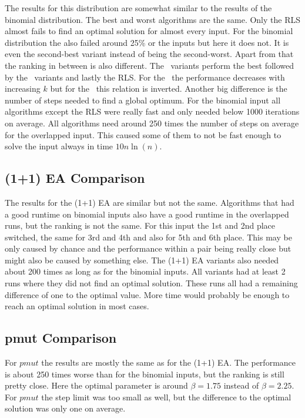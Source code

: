 The results for this distribution are somewhat similar to the results of the binomial distribution.
The best and worst algorithms are the same.
Only the RLS almost fails to find an optimal solution for almost every input.
For the binomial distribution the \RLSN[3] also failed around 25\% or the inputs but here it does not.
It is even the second-best variant instead of being the second-worst.
Apart from that the ranking in between is also different.
The \RLSN~variants perform the best followed by the \RLSR~variants and lastly the RLS.
For the \RLSN~the performance decreases with increasing $k$ but for the \RLSR~this relation is inverted.
Another big difference is the number of steps needed to find a global optimum.
For the binomial input all algorithms except the RLS were really fast and only needed below 1000 iterations on average.
All algorithms need around 250 times the number of steps on average for the overlapped input.
This caused some of them to not be fast enough to solve the input always in time $10n\ln(n)$.
\subsection{(1+1) EA Comparison}




The results for the (1+1) EA are similar but not the same.
Algorithms that had a good runtime on binomial inputs also have a good runtime in the overlapped runs, but the ranking is not the same.
For this input the 1st and 2nd place switched, the same for 3rd and 4th and also for 5th and 6th place.
This may be only caused by chance and the performance within a pair being really close but might also be caused by something else.
The (1+1) EA variants also needed about 200 times as long as for the binomial inputs.
All variants had at least 2 runs where they did not find an optimal solution.
These runs all had a remaining difference of one to the optimal value.
More time would probably be enough to reach an optimal solution in most cases.
\subsection{pmut Comparison}




For $pmut$ the results are mostly the same as for the (1+1) EA.
The performance is about 250 times worse than for the binomial inputs, but the ranking is still pretty close.
Here the optimal parameter is around $\beta=1.75$ instead of $\beta=2.25$.
For $pmut$ the step limit was too small as well, but the difference to the optimal solution was only one on average.
